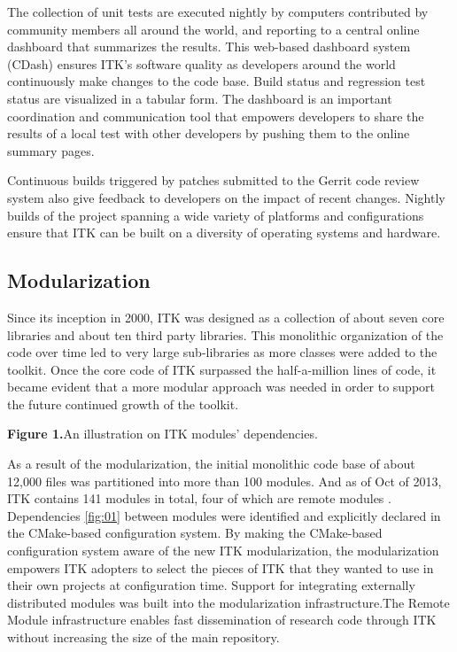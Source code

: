 \documentclass{frontiersENG} %
\begin{document}
The collection of unit tests are executed nightly by computers contributed by community members all around the world, and reporting to a central online dashboard that summarizes the results. This web-based dashboard system (CDash) \cite{ITK dashboard} ensures ITK’s software quality as developers around the world continuously make changes to the code base. Build status and regression test status are visualized in a tabular form. The dashboard is an important coordination and communication tool that empowers developers to share the results of a local test with other developers by pushing them to the online summary pages.

Continuous builds triggered by patches submitted to the Gerrit code review system also give feedback to developers on the impact of recent changes. Nightly builds of the project spanning a wide variety of platforms and configurations ensure that ITK can be built on a diversity of operating systems and hardware.


\subsection{Modularization}
Since its inception in 2000, ITK was designed as a collection of about seven core libraries and about ten third party libraries. This monolithic organization of the code over time led to very large sub-libraries as more classes were added to the toolkit. Once the core code of ITK surpassed the half-a-million lines of code, it became evident that a more modular approach was needed in order to support the future continued growth of the toolkit.

\textbf{Figure 1.}{An illustration on ITK modules' dependencies.}\label{fig:01}

As a result of the modularization, the initial monolithic code base of about 12,000 files was partitioned into more than 100 modules.  And as of Oct of 2013, ITK contains 141 modules in total, four of which are remote modules \cite{remote modules}.  Dependencies \ref{fig:01} between modules were identified and explicitly declared in the CMake-based configuration system. By making the CMake-based configuration system aware of the new ITK modularization, the modularization empowers ITK adopters to select the pieces of ITK that they wanted to use in their own projects at configuration time. Support for integrating externally distributed modules was built into the modularization infrastructure.The Remote Module infrastructure enables fast dissemination of research code through ITK without increasing the size of the main repository.
\end{document}
